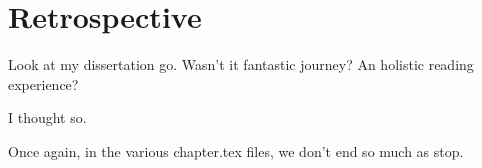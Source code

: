 \chapter{\label{ch:retro}Retrospective}

Look at my dissertation go.  Wasn't it fantastic journey?  An holistic reading experience?

I thought so. 

Once again, in the various chapter.tex files, we don't end so much as stop.
